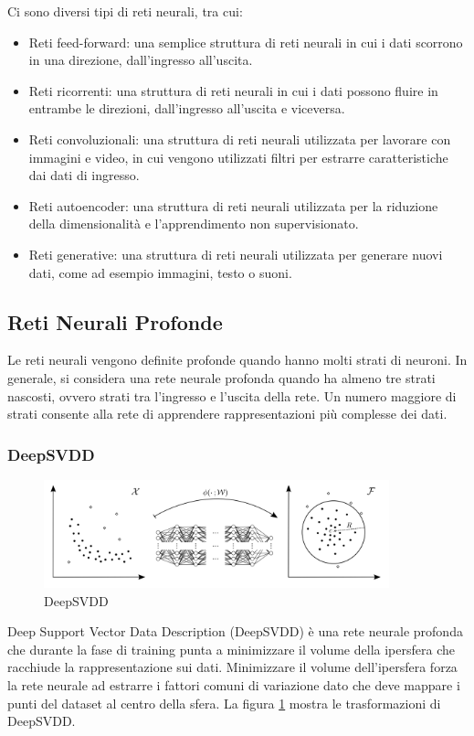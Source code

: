 Ci sono diversi tipi di reti neurali, tra cui:
\begin{itemize}
\item Reti feed-forward: una semplice struttura di reti neurali in cui i dati scorrono in una direzione, dall'ingresso all'uscita.
\item Reti ricorrenti: una struttura di reti neurali in cui i dati possono fluire in entrambe le direzioni, dall'ingresso all'uscita e viceversa.
\item  Reti convoluzionali: una struttura di reti neurali utilizzata per lavorare con immagini e video, in cui vengono utilizzati filtri per estrarre caratteristiche dai dati di ingresso.
\item Reti autoencoder: una struttura di reti neurali utilizzata per la riduzione della dimensionalità e l'apprendimento non supervisionato.
\item Reti generative: una struttura di reti neurali utilizzata per generare nuovi dati, come ad esempio immagini, testo o suoni.
\end{itemize}


\subsection{Reti Neurali Profonde}
Le reti neurali vengono definite profonde quando hanno molti strati di neuroni. In generale, si considera una rete neurale profonda quando ha almeno tre strati nascosti, ovvero strati tra l'ingresso e l'uscita della rete. Un numero maggiore di strati consente alla rete di apprendere rappresentazioni più complesse dei dati.
\subsubsection{DeepSVDD}
\begin{figure}[t]
	\centering
	\includegraphics[width=10cm, scale=1]{images/deepsvdd}
	\caption{DeepSVDD}
	\label{deepsvdd}
\end{figure}

Deep Support Vector Data Description (DeepSVDD) \cite{ruff2018deepsvdd} è una rete neurale profonda che durante la fase di training punta a minimizzare il volume della ipersfera che racchiude la rappresentazione sui dati. Minimizzare il volume dell'ipersfera forza la rete neurale ad estrarre i fattori comuni di variazione dato che deve mappare i punti del dataset al centro della sfera.  La figura \ref{deepsvdd} mostra le trasformazioni di DeepSVDD.

